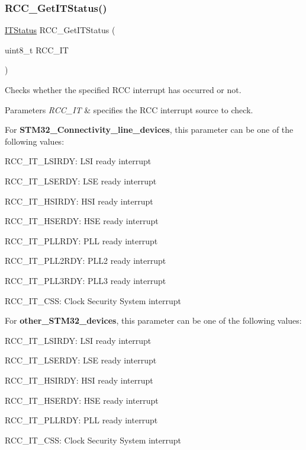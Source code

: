 \subsubsection{\texorpdfstring{R\+C\+C\+\_\+\+Get\+I\+T\+Status()}{RCC\_GetITStatus()}}
{\footnotesize\ttfamily \hyperlink{group___exported__types_gaacbd7ed539db0aacd973a0f6eca34074}{I\+T\+Status} R\+C\+C\+\_\+\+Get\+I\+T\+Status (\begin{DoxyParamCaption}\item[{uint8\+\_\+t}]{R\+C\+C\+\_\+\+IT }\end{DoxyParamCaption})}



Checks whether the specified R\+CC interrupt has occurred or not. 


\begin{DoxyParams}{Parameters}
{\em R\+C\+C\+\_\+\+IT} & specifies the R\+CC interrupt source to check.\\
\hline
\end{DoxyParams}
For {\bfseries S\+T\+M32\+\_\+\+Connectivity\+\_\+line\+\_\+devices}, this parameter can be one of the following values\+: \begin{DoxyItemize}
\item R\+C\+C\+\_\+\+I\+T\+\_\+\+L\+S\+I\+R\+DY\+: L\+SI ready interrupt \item R\+C\+C\+\_\+\+I\+T\+\_\+\+L\+S\+E\+R\+DY\+: L\+SE ready interrupt \item R\+C\+C\+\_\+\+I\+T\+\_\+\+H\+S\+I\+R\+DY\+: H\+SI ready interrupt \item R\+C\+C\+\_\+\+I\+T\+\_\+\+H\+S\+E\+R\+DY\+: H\+SE ready interrupt \item R\+C\+C\+\_\+\+I\+T\+\_\+\+P\+L\+L\+R\+DY\+: P\+LL ready interrupt \item R\+C\+C\+\_\+\+I\+T\+\_\+\+P\+L\+L2\+R\+DY\+: P\+L\+L2 ready interrupt \item R\+C\+C\+\_\+\+I\+T\+\_\+\+P\+L\+L3\+R\+DY\+: P\+L\+L3 ready interrupt \item R\+C\+C\+\_\+\+I\+T\+\_\+\+C\+SS\+: Clock Security System interrupt\end{DoxyItemize}
For {\bfseries other\+\_\+\+S\+T\+M32\+\_\+devices}, this parameter can be one of the following values\+: \begin{DoxyItemize}
\item R\+C\+C\+\_\+\+I\+T\+\_\+\+L\+S\+I\+R\+DY\+: L\+SI ready interrupt \item R\+C\+C\+\_\+\+I\+T\+\_\+\+L\+S\+E\+R\+DY\+: L\+SE ready interrupt \item R\+C\+C\+\_\+\+I\+T\+\_\+\+H\+S\+I\+R\+DY\+: H\+SI ready interrupt \item R\+C\+C\+\_\+\+I\+T\+\_\+\+H\+S\+E\+R\+DY\+: H\+SE ready interrupt \item R\+C\+C\+\_\+\+I\+T\+\_\+\+P\+L\+L\+R\+DY\+: P\+LL ready interrupt \item R\+C\+C\+\_\+\+I\+T\+\_\+\+C\+SS\+: Clock Security System interrupt\end{DoxyItemize}

